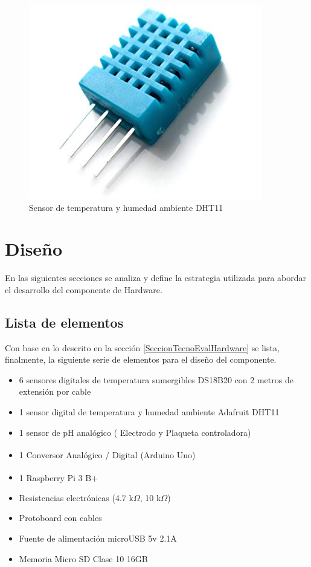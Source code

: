                 \begin{figure} [h]
                    \centering
                    \includegraphics[scale=0.35]{hardware/dht11_.jpg}
                    \caption{Sensor de temperatura y humedad ambiente DHT11}
                    \label{SensorDHT11}
                \end{figure}

        
\section{Diseño}
    \par En las siguientes secciones se analiza y define la estrategia utilizada para abordar el desarrollo del componente de Hardware.
    
    \subsection{Lista de elementos}
    \label{subsectionListaElemHard}
    Con base en lo descrito en la sección \ref{SeccionTecnoEvalHardware} se lista, finalmente, la siguiente serie de elementos para el diseño del componente.
        \begin{itemize}
            \item 6 sensores digitales de temperatura sumergibles DS18B20 con 2 metros de extensión por cable
            \item 1 sensor digital de temperatura y humedad ambiente Adafruit DHT11
            \item 1 sensor de pH analógico ( Electrodo y Plaqueta controladora)
            \item 1 Conversor Analógico / Digital (Arduino\textsuperscript{\textregistered} Uno)
            \item 1 Raspberry\textsuperscript{\textregistered} Pi 3 B+
            \item Resistencias electrónicas (4.7 k$\Omega$, 10 k$\Omega$)
            \item Protoboard con cables
            \item Fuente de alimentación microUSB 5v 2.1A
            \item Memoria Micro SD Clase 10 16GB
        \end{itemize}
        
